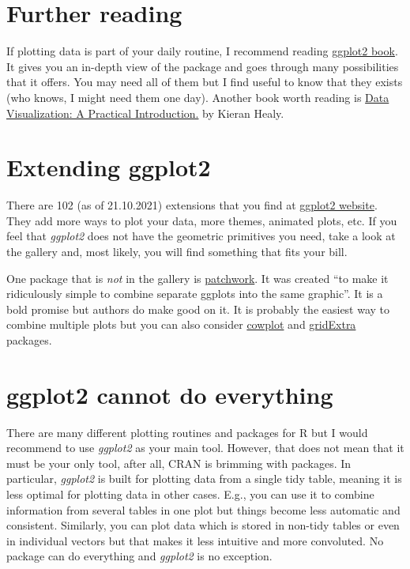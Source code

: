 \documentclass[
]{book}
\begin{document}
\hypertarget{further-reading}{%
\section{Further reading}\label{further-reading}}

If plotting data is part of your daily routine, I recommend reading \href{https://ggplot2-book.org/}{ggplot2 book}. It gives you an in-depth view of the package and goes through many possibilities that it offers. You may need all of them but I find useful to know that they exists (who knows, I might need them one day). Another book worth reading is \href{https://kieranhealy.org/publications/dataviz/}{Data Visualization: A Practical Introduction.} by Kieran Healy.

\hypertarget{extending-ggplot2}{%
\section{Extending ggplot2}\label{extending-ggplot2}}

There are 102 (as of 21.10.2021) extensions that you find at \href{https://exts.ggplot2.tidyverse.org/gallery/}{ggplot2 website}. They add more ways to plot your data, more themes, animated plots, etc. If you feel that \emph{ggplot2} does not have the geometric primitives you need, take a look at the gallery and, most likely, you will find something that fits your bill.

One package that is \emph{not} in the gallery is \href{https://patchwork.data-imaginist.com/}{patchwork}. It was created ``to make it ridiculously simple to combine separate ggplots into the same graphic''. It is a bold promise but authors do make good on it. It is probably the easiest way to combine multiple plots but you can also consider \href{https://github.com/wilkelab/cowplot}{cowplot} and \href{https://cran.r-project.org/web/packages/gridExtra/index.html}{gridExtra} packages.

\hypertarget{ggplot2-cannot-do-everything}{%
\section{ggplot2 cannot do everything}\label{ggplot2-cannot-do-everything}}

There are many different plotting routines and packages for R but I would recommend to use \emph{ggplot2} as your main tool. However, that does not mean that it must be your only tool, after all, CRAN is brimming with packages. In particular, \emph{ggplot2} is built for plotting data from a single tidy table, meaning it is less optimal for plotting data in other cases. E.g., you can use it to combine information from several tables in one plot but things become less automatic and consistent. Similarly, you can plot data which is stored in non-tidy tables or even in individual vectors but that makes it less intuitive and more convoluted. No package can do everything and \emph{ggplot2} is no exception.
\end{document}
